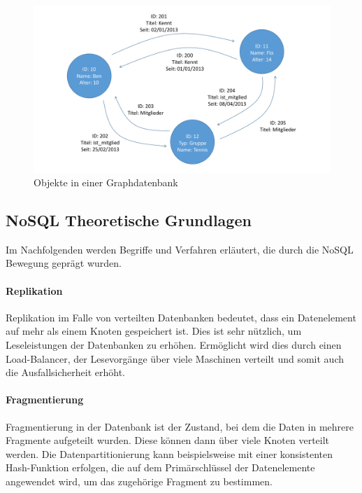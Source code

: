 \begin{figure}[htbp]
	\centering
  \includegraphics[width=1.0\textwidth, width=1.0\textwidth]{pics/graphdatabase.pdf}
	\caption{Objekte in einer Graphdatenbank}
	\label{graph_database}
\end{figure}

\subsection{NoSQL Theoretische Grundlagen}
\label{ch:grundlagen:sec:NoSQL:NoSQLBasics}

Im Nachfolgenden werden Begriffe und Verfahren erläutert, die durch die NoSQL Bewegung geprägt wurden.

\paragraph{Replikation} Replikation im Falle von verteilten Datenbanken bedeutet, dass ein Datenelement auf mehr als einem Knoten gespeichert ist. Dies ist sehr nützlich, um Leseleistungen der Datenbanken zu erhöhen. Ermöglicht wird dies durch einen Load-Balancer, der Lesevorgänge über viele Maschinen verteilt und somit auch die Ausfallsicherheit erhöht.  

\paragraph{Fragmentierung} Fragmentierung in der Datenbank ist der Zustand, bei dem die Daten in mehrere Fragmente aufgeteilt wurden. Diese können dann über viele Knoten verteilt werden. Die Datenpartitionierung kann beispielsweise mit einer konsistenten Hash-Funktion erfolgen, die auf dem Primärschlüssel der Datenelemente angewendet wird, um das zugehörige Fragment zu bestimmen.

